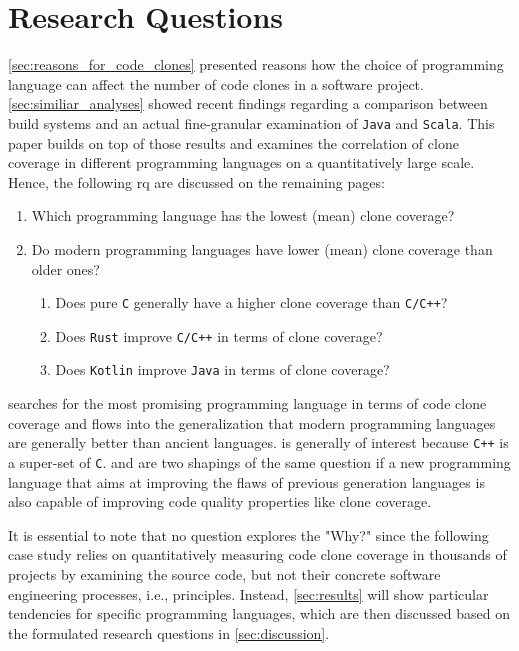 
\section{Research Questions}
\label{sec:research_question}

\autoref{sec:reasons_for_code_clones} presented reasons how the choice of programming language can affect the number of code clones in a software project. \autoref{sec:similiar_analyses} showed recent findings regarding a comparison between build systems and an actual fine-granular examination of \texttt{Java} and \texttt{Scala}. This paper builds on top of those results and examines the correlation of clone coverage in different programming languages on a quantitatively large scale. Hence, the following \ac{rq} are discussed on the remaining pages:

\begin{enumerate}
	\item Which programming language has the lowest (mean) clone coverage? \label{question:clone_coverage_lowest}
	\item Do modern programming languages have lower (mean) clone coverage than older ones? \label{question:comparing_age}
	\begin{enumerate}
		\item Does pure \texttt{C} generally have a higher clone coverage than \texttt{C/C++}? \label{question:compare_c_cpp}
		\item Does \texttt{Rust} improve \texttt{C/C++} in terms of clone coverage? \label{question:compare_rust_c}
		\item Does \texttt{Kotlin} improve \texttt{Java} in terms of clone coverage? \label{question:compare_kotlin_java}
	\end{enumerate}
\end{enumerate}

 searches for the most promising programming language in terms of code clone coverage and flows into the generalization that modern programming languages are generally better than ancient languages.
 is generally of interest because \texttt{C++} is a super-set of \texttt{C}.   and  are two shapings of the same question if a new programming language that aims at improving the flaws of previous generation languages is also capable of improving code quality properties like clone coverage.

It is essential to note that no question explores the "Why?" since the following case study relies on quantitatively measuring code clone coverage in thousands of projects by examining the source code, but not their concrete software engineering processes, i.e., principles. Instead, \autoref{sec:results} will show particular tendencies for specific programming languages, which are then discussed based on the formulated research questions in \autoref{sec:discussion}.
